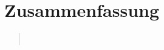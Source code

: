     
\section{Zusammenfassung}
\begin{quote}

     \\
\end{quote}%
         



\begin{thebibliography}{999}
%      



\end{thebibliography}


        
